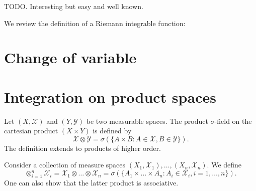 \begin{definition}[]
    \label{def:9.4}
    TODO. Interesting but easy and well known.
\end{definition}

We review the definition of a Riemann integrable function:

\begin{definition}[title]
    \label{def:title}
    
\end{definition}

\section{Change of variable}%
\label{sec:Change of variable}

\section{Integration on product spaces}%
\label{sec:Integration on product spaces}

\begin{definition}
    \label{def:9.9}
    Let $(X, \mathscr{X})$ and $(Y, \mathscr{Y})$ be two measurable spaces. The product
    $\sigma$-field on the cartesian product $(X \times Y)$ is defined by
    \[
    \mathscr{X} \otimes \mathscr{Y} = \sigma(\{A\times B: A \in \mathscr{X}, B \in \mathscr{Y}\} )
    .\] 
    The definition extends to products of higher order. 

    Consider a collection of measure spaces $(X_1, \mathscr{X}_1), \ldots, (X_n, \mathscr{X}_n)$. We define
    \[
    \otimes_{i=1}^{n}\mathscr{X}_i = \mathscr{X}_1 \otimes \ldots \otimes \mathscr{X}_n
    = \sigma(\{A_1\times \ldots\times A_n: A_i \in \mathscr{X}_i, i =1, \ldots, n\} )
    .\] 
    One can also show that the latter product is associative.
\end{definition}
